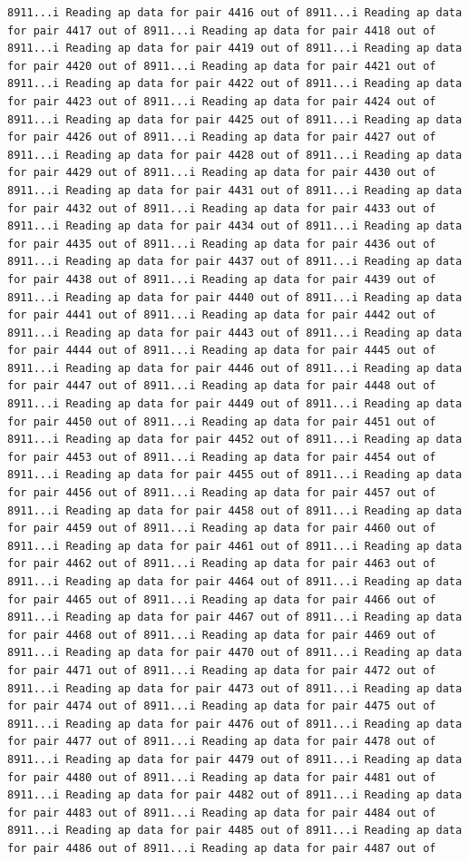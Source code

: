 \documentclass[
]{article}
\begin{document}
\begin{verbatim}
8911...i Reading ap data for pair 4416 out of 8911...i Reading ap data for pair 4417 out of 8911...i Reading ap data for pair 4418 out of 8911...i Reading ap data for pair 4419 out of 8911...i Reading ap data for pair 4420 out of 8911...i Reading ap data for pair 4421 out of 8911...i Reading ap data for pair 4422 out of 8911...i Reading ap data for pair 4423 out of 8911...i Reading ap data for pair 4424 out of 8911...i Reading ap data for pair 4425 out of 8911...i Reading ap data for pair 4426 out of 8911...i Reading ap data for pair 4427 out of 8911...i Reading ap data for pair 4428 out of 8911...i Reading ap data for pair 4429 out of 8911...i Reading ap data for pair 4430 out of 8911...i Reading ap data for pair 4431 out of 8911...i Reading ap data for pair 4432 out of 8911...i Reading ap data for pair 4433 out of 8911...i Reading ap data for pair 4434 out of 8911...i Reading ap data for pair 4435 out of 8911...i Reading ap data for pair 4436 out of 8911...i Reading ap data for pair 4437 out of 8911...i Reading ap data for pair 4438 out of 8911...i Reading ap data for pair 4439 out of 8911...i Reading ap data for pair 4440 out of 8911...i Reading ap data for pair 4441 out of 8911...i Reading ap data for pair 4442 out of 8911...i Reading ap data for pair 4443 out of 8911...i Reading ap data for pair 4444 out of 8911...i Reading ap data for pair 4445 out of 8911...i Reading ap data for pair 4446 out of 8911...i Reading ap data for pair 4447 out of 8911...i Reading ap data for pair 4448 out of 8911...i Reading ap data for pair 4449 out of 8911...i Reading ap data for pair 4450 out of 8911...i Reading ap data for pair 4451 out of 8911...i Reading ap data for pair 4452 out of 8911...i Reading ap data for pair 4453 out of 8911...i Reading ap data for pair 4454 out of 8911...i Reading ap data for pair 4455 out of 8911...i Reading ap data for pair 4456 out of 8911...i Reading ap data for pair 4457 out of 8911...i Reading ap data for pair 4458 out of 8911...i Reading ap data for pair 4459 out of 8911...i Reading ap data for pair 4460 out of 8911...i Reading ap data for pair 4461 out of 8911...i Reading ap data for pair 4462 out of 8911...i Reading ap data for pair 4463 out of 8911...i Reading ap data for pair 4464 out of 8911...i Reading ap data for pair 4465 out of 8911...i Reading ap data for pair 4466 out of 8911...i Reading ap data for pair 4467 out of 8911...i Reading ap data for pair 4468 out of 8911...i Reading ap data for pair 4469 out of 8911...i Reading ap data for pair 4470 out of 8911...i Reading ap data for pair 4471 out of 8911...i Reading ap data for pair 4472 out of 8911...i Reading ap data for pair 4473 out of 8911...i Reading ap data for pair 4474 out of 8911...i Reading ap data for pair 4475 out of 8911...i Reading ap data for pair 4476 out of 8911...i Reading ap data for pair 4477 out of 8911...i Reading ap data for pair 4478 out of 8911...i Reading ap data for pair 4479 out of 8911...i Reading ap data for pair 4480 out of 8911...i Reading ap data for pair 4481 out of 8911...i Reading ap data for pair 4482 out of 8911...i Reading ap data for pair 4483 out of 8911...i Reading ap data for pair 4484 out of 8911...i Reading ap data for pair 4485 out of 8911...i Reading ap data for pair 4486 out of 8911...i Reading ap data for pair 4487 out of 
\end{verbatim}
\end{document}
